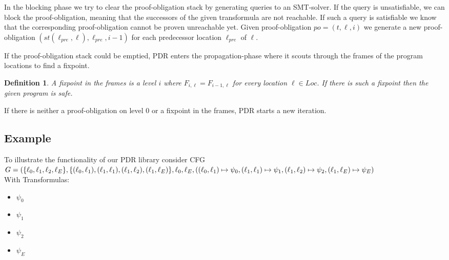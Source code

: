 \documentclass{article}
\newtheorem{mydef}{Definition}
\newcommand\mycom[1]{}
\newcommand\mycom[1]{#1}
\newcommand{\jw}[1]{\mycom{\todo[color=blue!40,inline]{\small JW: #1}}}
\begin{document}
	\bigskip
	
	In the blocking phase we try to clear the proof-obligation stack by generating queries to an SMT-solver.
	If the query is unsatisfiable, we can block the proof-obligation, meaning that the successors of the given transformula are not reachable.
	If such a query is satisfiable we know that the corresponding proof-obligation cannot be proven unreachable yet. Given proof-obligation  $po = (t, \ell, i)$ we generate a new proof-obligation $(st(\ell_{pre}, \ell), \ell_{pre}, i-1) $ for each predecessor location $\ell_{pre}$ of $\ell$.
	
	\bigskip
	
	If the proof-obligation stack could be emptied, PDR enters the propagation-phase where it scouts through the frames of the program locations to find a fixpoint. \\
	\begin{mydef}
		A fixpoint in the frames is a level $i$ where $F_{i, \ell} = F_{i-1, \ell}$ for every location $\ell \in Loc$. If there is such a fixpoint then the given program is safe.
	\end{mydef}
	If there is neither a proof-obligation on level 0 or a fixpoint in the frames, PDR starts a new iteration.
	
	\bigskip
	
	\jw{Rename details here to definitions used in this paper}
	\subsection{Example}
	To illustrate the functionality of our PDR library consider CFG \\ $ G = (\{\ell_0, \ell_1, \ell_2, \ell_E \}, \\ \{(\ell_0, \ell_1), (\ell_1, \ell_1), (\ell_1, \ell_2), (\ell_1, \ell_E) \}, \\ \ell_0, \ell_E, ( (\ell_0, \ell_1) \mapsto \psi_0, (\ell_1, \ell_1) \mapsto \psi_1, (\ell_1, \ell_2) \mapsto \psi_2, (\ell_1, \ell_E) \mapsto \psi_E)$ \\
	With Transformulas: \\
	\begin{itemize}
	\item $\psi_0$
	\item $\psi_1$
	\item $\psi_2$
	\item $\psi_E$
	\end{itemize}
	
	
	
\end{document}
